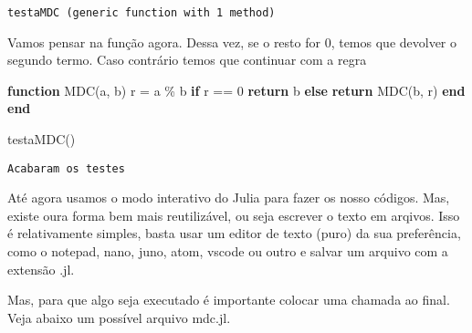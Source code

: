 \documentclass[
  letterpaper,
  DIV=11,
  numbers=noendperiod]{scrreprt}
\newenvironment{Shaded}{\begin{snugshade}}{\end{snugshade}}
\newcommand{\ControlFlowTok}[1]{\textcolor[rgb]{0.00,0.23,0.31}{\textbf{#1}}}
\newcommand{\FloatTok}[1]{\textcolor[rgb]{0.68,0.00,0.00}{#1}}
\newcommand{\FunctionTok}[1]{\textcolor[rgb]{0.28,0.35,0.67}{#1}}
\newcommand{\KeywordTok}[1]{\textcolor[rgb]{0.00,0.23,0.31}{\textbf{#1}}}
\newcommand{\NormalTok}[1]{\textcolor[rgb]{0.00,0.23,0.31}{#1}}
\newcommand{\OperatorTok}[1]{\textcolor[rgb]{0.37,0.37,0.37}{#1}}
\begin{document}
\begin{verbatim}
testaMDC (generic function with 1 method)
\end{verbatim}

Vamos pensar na função agora. Dessa vez, se o resto for 0, temos que
devolver o segundo termo. Caso contrário temos que continuar com a regra

\begin{Shaded}
\begin{Highlighting}[]
\KeywordTok{function} \FunctionTok{MDC}\NormalTok{(a, b)}
\NormalTok{    r }\OperatorTok{=}\NormalTok{ a }\OperatorTok{\%}\NormalTok{ b}
    \ControlFlowTok{if}\NormalTok{ r }\OperatorTok{==} \FloatTok{0}
        \ControlFlowTok{return}\NormalTok{ b}
    \ControlFlowTok{else}
        \ControlFlowTok{return} \FunctionTok{MDC}\NormalTok{(b, r)}
    \ControlFlowTok{end}
\KeywordTok{end}

\FunctionTok{testaMDC}\NormalTok{()}
\end{Highlighting}
\end{Shaded}

\begin{verbatim}
Acabaram os testes
\end{verbatim}

Até agora usamos o modo interativo do Julia para fazer os nosso códigos.
Mas, existe oura forma bem mais reutilizável, ou seja escrever o texto
em arqivos. Isso é relativamente simples, basta usar um editor de texto
(puro) da sua preferência, como o notepad, nano, juno, atom, vscode ou
outro e salvar um arquivo com a extensão .jl.

Mas, para que algo seja executado é importante colocar uma chamada ao
final. Veja abaixo um possível arquivo mdc.jl.
\end{document}

